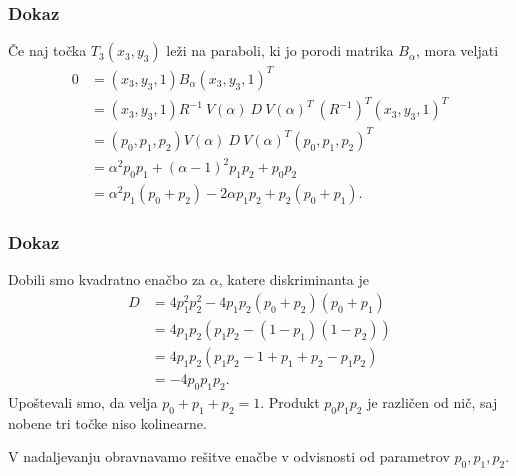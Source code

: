 \documentclass{beamer}
\newcommand{\al}{\alpha}
\begin{document}

\begin{frame}
\frametitle{Dokaz}

Če naj točka $T_3 ( x_3,y_3) $ leži na paraboli, ki jo porodi matrika $B_{\al}$, mora veljati
\begin{align*}
0	&= ( x_3,y_3, 1) B_\al ( x_3,y_3, 1)^T \nonumber \\
	&= ( x_3,y_3, 1) R^{-1}\  V(\al) \ D \ V(\al)^T \  (R^{-1})^T ( x_3,y_3, 1)^T \nonumber \\
	&= (p_0, p_1, p_2)  V(\al) \ D \ V(\al)^T(p_0, p_1, p_2)^T \nonumber \\
	&= \al^2 p_0 p_1 + (\al - 1)^2 p_1 p_2 + p_0 p_2 \\
	&= \al^2 p_1(p_0 + p_2) - 2 \al p_1 p_2 + p_2(p_0 + p_1).
\end{align*}

\end{frame}


\begin{frame}
\frametitle{Dokaz}

Dobili smo kvadratno enačbo za $\al$, katere diskriminanta je 
\begin{align*}
D	&= 4 p_1^2 p_2^2 - 4 p_1 p_2(p_0 + p_2)(p_0 + p_1)  \\
	&= 4 p_1 p_2(p_1 p_2 - (1 - p_1)(1 - p_2))  \\
	&= 4 p_1 p_2(p_1 p_2 - 1 + p_1 + p_2 - p_1 p_2)  \\
	&= - 4 p_0 p_1 p_2. 
\end{align*}
Upoštevali smo, da velja $ p_0 + p_1 + p_2 = 1$. Produkt $p_0 p_1 p_2$ je različen od nič, saj nobene tri točke niso kolinearne.

V nadaljevanju obravnavamo rešitve enačbe v odvisnosti od parametrov $p_0, p_1, p_2$.

\end{frame}

\end{document}
